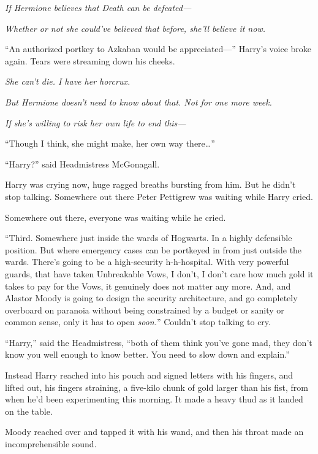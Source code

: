 \emph{If Hermione believes that Death can be defeated—}

\emph{Whether or not she could’ve believed that before, she’ll believe it now.}

“An authorized portkey to Azkaban would be appreciated—” Harry’s voice broke again. Tears were streaming down his cheeks.

\emph{She can’t die. I have her horcrux.}

\emph{But Hermione doesn’t need to know about that. Not for one more week.}

\emph{If she’s willing to risk her own life to end this—}

“Though I think, she might make, her own way there…”

“Harry?” said Headmistress McGonagall.

Harry was crying now, huge ragged breaths bursting from him. But he didn’t stop talking. Somewhere out there Peter Pettigrew was waiting while Harry cried.

Somewhere out there, everyone was waiting while he cried.

“Third. Somewhere just inside the wards of Hogwarts. In a highly defensible position. But where emergency cases can be portkeyed in from just outside the wards. There’s going to be a high-security h-h-hospital. With very powerful guards, that have taken Unbreakable Vows, I don’t, I don’t care how much gold it takes to pay for the Vows, it genuinely does not matter any more. And, and Alastor Moody is going to design the security architecture, and go completely overboard on paranoia without being constrained by a budget or sanity or common sense, only it has to open \emph{soon.}” Couldn’t stop talking to cry.

“Harry,” said the Headmistress, “both of them think you’ve gone mad, they don’t know you well enough to know better. You need to slow down and explain.”

Instead Harry reached into his pouch and signed letters with his fingers, and lifted out, his fingers straining, a five-kilo chunk of gold larger than his fist, from when he’d been experimenting this morning. It made a heavy thud as it landed on the table.

Moody reached over and tapped it with his wand, and then his throat made an incomprehensible sound.

